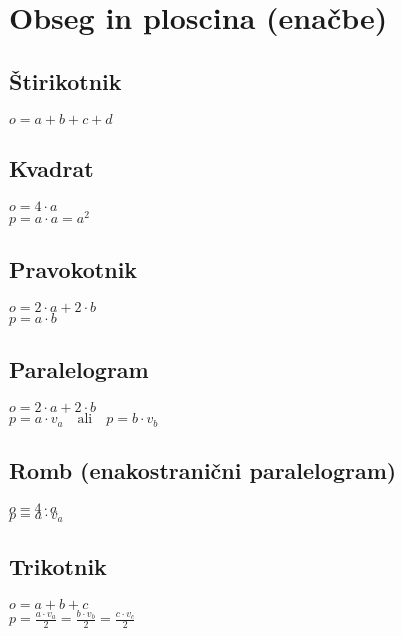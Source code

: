 \documentclass{article}
\begin{document}
\pagestyle{empty}

\begin{comment}
definitions
\end{comment}

\section{ Obseg in ploscina (enačbe) }

\subsection{ Štirikotnik }
$o = a + b + c + d$

\subsection{ Kvadrat }
$o = 4 \cdot a $ \\
$p = a \cdot a = a ^ 2$


\subsection{ Pravokotnik }
$o = 2 \cdot a + 2 \cdot b $ \\
$p = a \cdot b$

\subsection{ Paralelogram }
$o = 2 \cdot a + 2 \cdot b $ \\
$p = a \cdot v_a \quad \text{ali} \quad p = b \cdot v_b $


\subsection{ Romb (enakostranični paralelogram) }
$o = 4 \cdot a $ \\
$p = a \cdot v_a $

\subsection{ Trikotnik }
$o = a + b + c $ \\
$p = \frac{a \cdot v_a}{2} = \frac{b \cdot v_b}{2} = \frac{c \cdot v_c}{2} $
\end{document}
